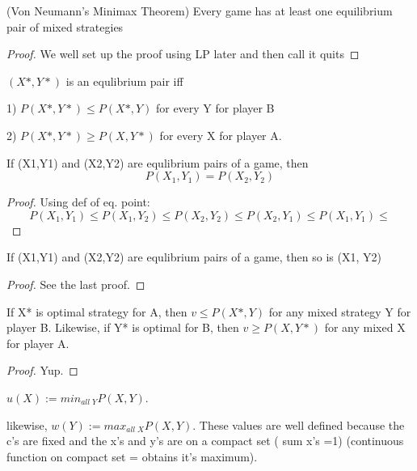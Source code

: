 \begin{theorem} (Von Neumann's Minimax Theorem) Every game has at least one equilibrium pair of mixed strategies
\end{theorem}

\begin{proof}We well set up the proof using LP later and then call it quits\end{proof}

\begin{definition}
$(X*,Y*)$ is an equlibrium pair iff

1) $P(X*,Y*) \leq P(X*,Y)$ for every Y for player B

2) $P(X*,Y*) \geq P(X,Y*)$ for every X for player A.
\end{definition}


\begin{theorem} 
If (X1,Y1) and (X2,Y2) are equlibrium pairs of a game, then \[P(X_1,Y_1)=P(X_2,Y_2)\]
\end{theorem}

\begin{proof}
Using def of eq. point:
\[ P(X_1,Y_1) \leq P(X_1,Y_2) \leq P(X_2,Y_2) \leq P(X_2,Y_1) \leq P(X_1,Y_1) \leq \]
\end{proof}

\begin{theorem} 
If (X1,Y1) and (X2,Y2) are equlibrium pairs of a game, then so is (X1, Y2)
\end{theorem}

\begin{proof}
See the last proof.
\end{proof}

\begin{theorem} 
If X* is optimal strategy for A, then $v \leq P(X*,Y)$ for any mixed strategy Y for player B. Likewise, if Y* is optimal for B, then $v \geq P(X,Y*)$ for any mixed X for player A.
\end{theorem}

\begin{proof}
Yup.
\end{proof}

\begin{definition}
 $u(X):= min_{all\; Y} P(X,Y)$.

likewise, $w(Y):=max_{all\; X} P(X,Y)$. These values are well defined because the c's are fixed and the x's and y's are on a compact set ( sum x's  =1) (continuous function on compact set = obtains it's maximum).
\end{definition}

